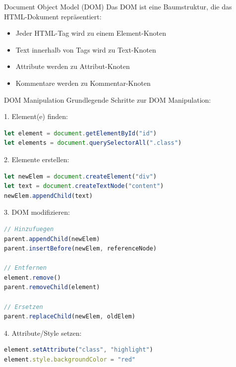 \begin{concept}{Document Object Model (DOM)}
    Das DOM ist eine Baumstruktur, die das HTML-Dokument repräsentiert:
    \begin{itemize}
        \item Jeder HTML-Tag wird zu einem Element-Knoten
        \item Text innerhalb von Tags wird zu Text-Knoten
        \item Attribute werden zu Attribut-Knoten
        \item Kommentare werden zu Kommentar-Knoten
    \end{itemize}
\end{concept}

\begin{KR}{DOM Manipulation}
Grundlegende Schritte zur DOM Manipulation:

1. Element(e) finden:
\begin{lstlisting}[language=JavaScript, style=basesmol]
let element = document.getElementById("id")
let elements = document.querySelectorAll(".class")
\end{lstlisting}

2. Elemente erstellen:
\begin{lstlisting}[language=JavaScript, style=basesmol]
let newElem = document.createElement("div")
let text = document.createTextNode("content")
newElem.appendChild(text)
\end{lstlisting}

3. DOM modifizieren:
\begin{lstlisting}[language=JavaScript, style=basesmol]
// Hinzufuegen
parent.appendChild(newElem)
parent.insertBefore(newElem, referenceNode)

// Entfernen
element.remove()
parent.removeChild(element)

// Ersetzen
parent.replaceChild(newElem, oldElem)
\end{lstlisting}

4. Attribute/Style setzen:
\begin{lstlisting}[language=JavaScript, style=basesmol]
element.setAttribute("class", "highlight")
element.style.backgroundColor = "red"
\end{lstlisting}
\end{KR}



